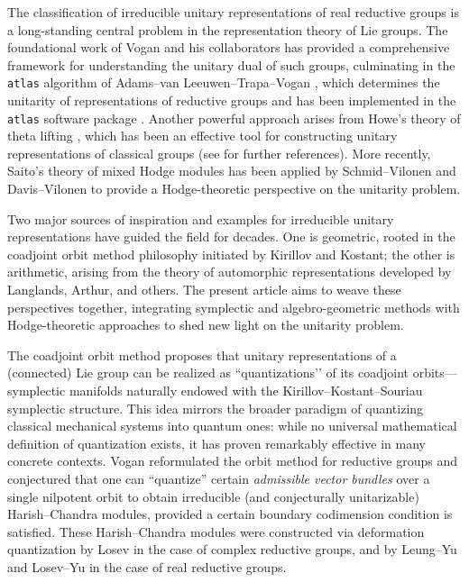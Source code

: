 \documentclass[11pt, a4paper]{amsart}
\theoremstyle{definition}
\numberwithin{equation}{section}
\begin{document}
The classification of irreducible unitary representations of real reductive groups is a long-standing central problem in the representation theory of Lie groups. The foundational work of Vogan and his collaborators has provided a comprehensive framework for understanding the unitary dual of such groups, culminating in the \texttt{atlas} algorithm of Adams–van Leeuwen–Trapa–Vogan \cite{ALTV}, which determines the unitarity of representations of reductive groups and has been implemented in the \texttt{atlas} software package \cite{atlas}. Another powerful approach arises from Howe’s theory of theta lifting \cite{Howe79, Howe89}, which has been an effective tool for constructing unitary representations of classical groups (see  for further references). More recently, Saito’s theory of mixed Hodge modules \cite{Saito88, Saito90} has been applied by Schmid–Vilonen \cite{SchmidVilonen} and Davis–Vilonen \cite{DavisVilonen:MHM_real_groups, DavisVilonen:unitary} to provide a Hodge-theoretic perspective on the unitarity problem.

Two major sources of inspiration and examples for irreducible unitary representations have guided the field for decades. One is geometric, rooted in the coadjoint orbit method philosophy initiated by Kirillov and Kostant; the other is arithmetic, arising from the theory of automorphic representations developed by Langlands, Arthur, and others. The present article aims to weave these perspectives together, integrating symplectic and algebro-geometric methods with Hodge-theoretic approaches to shed new light on the unitarity problem.


The coadjoint orbit method proposes that unitary representations of a (connected) Lie group can be realized as “quantizations’’ of its coadjoint orbits—symplectic manifolds naturally endowed with the Kirillov–Kostant–Souriau symplectic structure. This idea mirrors the broader paradigm of quantizing classical mechanical systems into quantum ones: while no universal mathematical definition of quantization exists, it has proven remarkably effective in many concrete contexts. 
Vogan \cite{Vogan_AV} reformulated the orbit method for reductive groups and conjectured that one can ``quantize'' certain \emph{admissible vector bundles} over a single nilpotent orbit to obtain irreducible (and conjecturally unitarizable) Harish–Chandra modules, provided a certain boundary codimension condition is satisfied. These Harish–Chandra modules were constructed via deformation quantization by Losev \cite{Losev:quan_symp_orbit} in the case of complex reductive groups, and by Leung–Yu \cite{LY} and Losev–Yu \cite{LosevYu} in the case of real reductive groups.
\end{document}
